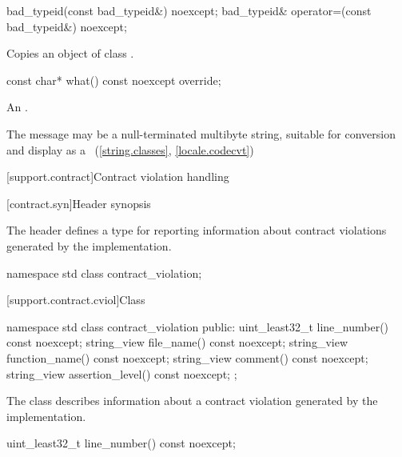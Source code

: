 %
%
\begin{itemdecl}
bad_typeid(const bad_typeid&) noexcept;
bad_typeid& operator=(const bad_typeid&) noexcept;
\end{itemdecl}

\begin{itemdescr}
\pnum
\effects
Copies an object of class
.
\end{itemdescr}

%
\begin{itemdecl}
const char* what() const noexcept override;
\end{itemdecl}

\begin{itemdescr}
\pnum
\returns
An  \ntbs{}.

\pnum
\remarks
The message may be a null-terminated multibyte string,
suitable for conversion and display as a
~(\ref{string.classes}, \ref{locale.codecvt})
\end{itemdescr}

[support.contract]{Contract violation handling}

[contract.syn]{Header  synopsis}

The header  defines a type
for reporting information about contract violations
generated by the implementation.
\begin{codeblock}
namespace std {
  class contract_violation;
}
\end{codeblock}

[support.contract.cviol]{Class }
%

\begin{codeblock}
namespace std {
  class contract_violation {
  public:
    uint_least32_t line_number() const noexcept;
    string_view file_name() const noexcept;
    string_view function_name() const noexcept;
    string_view comment() const noexcept;
    string_view assertion_level() const noexcept;
  };
}
\end{codeblock}

\pnum
The class  describes information about
a contract violation generated by the implementation.

%
\begin{itemdecl}
uint_least32_t line_number() const noexcept;
\end{itemdecl}

